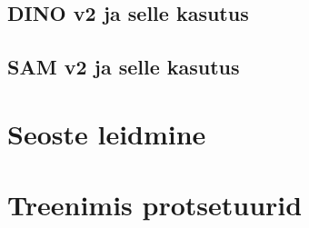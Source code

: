 \subsection{DINO v2 ja selle kasutus}



\subsection{SAM v2  ja selle kasutus}


\section{Seoste leidmine}


\section{Treenimis protsetuurid}
